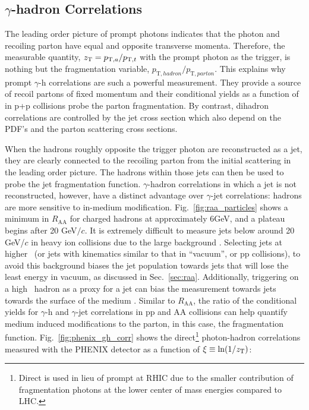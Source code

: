 \subsection{$\gamma$-hadron Correlations}
\label{sec:intro_gh}
The leading order picture of prompt photons indicates that the photon and recoiling parton have equal and opposite transverse momenta. Therefore, the measurable quantity, $z_{\mathrm{T}} = p_{\mathrm{T},a}/p_{\mathrm{T},t}$ with the prompt photon as the trigger,  is nothing but the fragmentation variable, $p_{\mathrm{T},hadron}/p_{\mathrm{T},parton}$. This explains why prompt $\gamma$-h correlations are such a powerful measurement. They provide a source of recoil partons of fixed momentum and their conditional yields as a function of \zt in p+p collisions probe the parton fragmentation. By contrast, dihadron correlations are controlled by the jet cross section which also depend on the PDF’s and the parton scattering cross sections. 

When the hadrons roughly opposite the trigger photon are reconstructed as a jet, they are clearly connected to the recoiling parton from the initial scattering in the leading order picture. The hadrons within those jets can then be used to probe the jet fragmentation function. $\gamma$-hadron correlations in which a jet is not reconstructed, however, have a distinct advantage over $\gamma$-jet correlations: hadrons are more sensitive to in-medium modification. Fig.~\ref{fig:raa_particles} shows a minimum in $R_\mathrm{AA}$ for charged hadrons at approximately 6GeV, and a plateau begins after 20 GeV$/c$. It is extremely difficult to measure jets below around 20 GeV/$c$ in heavy ion collisions due to the large background \cite{STARCollaboration2017}. Selecting jets at higher \pt~(or jets with kinematics similar to that in ``vacuum'', or pp collisions), to avoid this background biases the jet population towards jets that will lose the least energy in vacuum, as discussed in Sec.~\ref{sec:raa}. Additionally, triggering on a high \pt~hadron as a proxy for a jet can bias the measurement towards jets towards the surface of the medium \cite{Zhang2007}. Similar to $R_\mathrm{AA}$, the ratio of the conditional yields for $\gamma$-h and $\gamma$-jet correlations in pp and AA collisions can help quantify medium induced modifications to the parton, in this case, the fragmentation function. Fig.~\ref{fig:phenix_gh_corr} shows the direct\footnote{Direct is used in lieu of prompt at RHIC due to the smaller contribution of fragmentation photons at the lower center of mass energies compared to LHC.} photon-hadron correlations measured with the PHENIX detector as a function of $\xi\equiv\ln(1/z_{\mathrm{T}})$:

